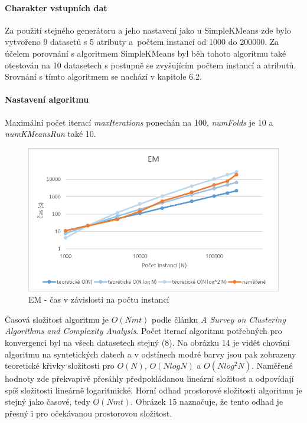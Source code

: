 \documentclass[12pt]{article}
\begin{document}
\newpage
{}
\paragraph{Charakter vstupních dat}
Za použití stejného generátoru a jeho nastavení jako u SimpleKMeans zde bylo vytvořeno 9 datasetů s 5 atributy a~počtem instancí od 1000 do 200000. Za účelem porovnání s algoritmem SimpleKMeans byl běh tohoto algoritmu také otestován na 10 datasetech s postupně se zvyšujícím počtem instancí a atributů. Srovnání s tímto algoritmem se nachází v kapitole 6.2.
\paragraph{Nastavení algoritmu}
Maximální počet iterací \textit{maxIterations} ponechán na 100, \textit{numFolds} je 10 a \textit{numKMeansRun} také 10.
\begin{figure}[hbp]
  \centering
  \includegraphics[scale=1]{img/em.png}
  \caption{EM - čas v závislosti na počtu instancí}
\end{figure}
Časová složitost algoritmu je $O(Nmt)$ podle článku \textit{A Survey on Clustering Algorithms and Complexity Analysis}. \citep{uddin} 
\newline
\indent
Počet iterací algoritmu potřebných pro konvergenci byl na všech datasetech stejný (8). Na obrázku 14 je vidět chování algoritmu na syntetických datech a v odstínech modré barvy jsou pak zobrazeny teoretické křivky složitosti pro $O(N)$, $O(N log N)$ a $O(N log^2 N)$. Naměřené hodnoty zde překvapivě přesáhly předpokládanou lineární složitost a odpovídají spíš složitosti lineárně logaritmické.
Horní odhad prostorové složitosti algoritmu je stejný jako časové, tedy $O(Nmt)$. Obrázek 15 naznačuje, že tento odhad je přesný i pro očekávanou prostorovou složitost.
\end{document}
